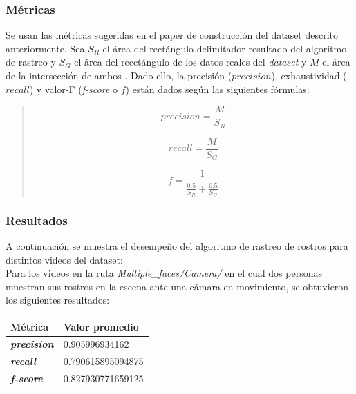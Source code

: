 \documentclass[a4paper,openright,12pt]{report}
\begin{document}
\subsubsection{Métricas}
Se usan las métricas sugeridas en el paper de construcción del dataset descrito
anteriormente. Sea $S_{R}$ el área del rectángulo delimitador resultado del
algoritmo de rastreo y $S_{G}$ el área del recctángulo de los datos reales del
\textit{dataset} y $M$ el área de la intersección de ambos
\cite{do2014construction}. Dado ello, la
precisión ($precision$), exhaustividad ($recall$) y valor-F (\textit{f-score} o
$f$) están dados según las siguientes fórmulas:\\

  \begin{framed}
    \begin{quote}
      \[
          precision = \frac{M}{S_{R}}
      \]

      \[
          recall = \frac{M}{S_{G}}
      \]

      \[
          f = \frac{1}{\frac{0.5}{S_{R}} + \frac{0.5}{S_{G}}}
      \]
    \raggedleft\cite{do2014construction}
    \end{quote}
  \end{framed}

\subsubsection{Resultados}
A continuación se muestra el desempeño del algoritmo de rastreo de rostros para
distintos videos del dataset:\\

Para los videos en la ruta \textit{Multiple\_faces/Camera/}
en el cual dos personas muestran sus rostros en la escena ante una cámara en
movimiento, se obtuvieron los siguientes resultados:

\begin{center}
  \begin{longtable}{| p{} | p{} |}
  \hline
  \textbf{Métrica} &
  \textbf{Valor promedio}
  \\ \hline

  \textbf{\textit{precision}} &
  0.905996934162
  \\ \hline

  \textbf{\textit{recall}} &
  0.790615895094875
  \\ \hline

  \textbf{\textit{f-score}} &
  0.827930771659125
  \\ \hline
  \end{longtable}
\end{center}
\end{document}
